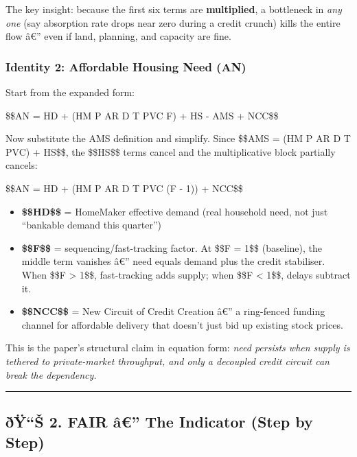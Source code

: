 The key insight: because the first six terms are \textbf{multiplied}, a
bottleneck in \emph{any one} (say absorption rate drops near zero during
a credit crunch) kills the entire flow â€'' even if land, planning, and
capacity are fine.

\subsubsection{Identity 2: Affordable Housing Need
(AN)}\label{identity-2-affordable-housing-need-an}

Start from the expanded form:

\$\$AN = HD + (HM \cdot P \cdot AR \cdot D \cdot T \cdot PVC \cdot F) +
HS - AMS + NCC\$\$

Now substitute the AMS definition and simplify. Since \$\$AMS = (HM
\cdot P \cdot AR \cdot D \cdot T \cdot PVC) + HS\$\$, the \$\$HS\$\$
terms cancel and the multiplicative block partially cancels:

\$\$AN = HD + (HM \cdot P \cdot AR \cdot D \cdot T \cdot PVC \cdot (F -
1)) + NCC\$\$

\begin{itemize}
\tightlist
\item
  \textbf{\$\$HD\$\$} = HomeMaker effective demand (real household need,
  not just ``bankable demand this quarter'')
\item
  \textbf{\$\$F\$\$} = sequencing/fast-tracking factor. At \$\$F = 1\$\$
  (baseline), the middle term vanishes â€'' need equals demand plus the
  credit stabiliser. When \$\$F \textgreater{} 1\$\$, fast-tracking adds
  supply; when \$\$F \textless{} 1\$\$, delays subtract it.
\item
  \textbf{\$\$NCC\$\$} = New Circuit of Credit Creation â€'' a
  ring-fenced funding channel for affordable delivery that doesn't just
  bid up existing stock prices.
\end{itemize}

This is the paper's structural claim in equation form: \emph{need
persists when supply is tethered to private-market throughput, and only
a decoupled credit circuit can break the dependency.}

\begin{center}\rule{0.5\linewidth}{0.5pt}\end{center}

\subsection{ðŸ``Š 2. FAIR â€'' The Indicator (Step by
Step)}\label{uxf0uxffux161-2.-fair-uxe2-the-indicator-step-by-step}

